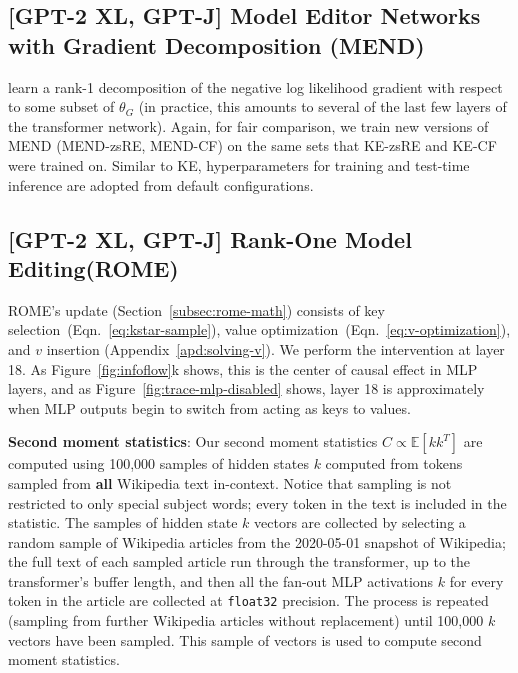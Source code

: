 \documentclass{article}
\newcommand{\methodlong}{Rank-One Model Editing\xspace}
\newcommand{\method}{ROME\xspace}
\newcommand{\reffig}[1]{Figure~\ref{fig:#1}}
\newcommand{\refeqn}[1]{Eqn.~\ref{eq:#1}}
\begin{document}
\begin{appendices}
\subsection{[GPT-2 XL, GPT-J] Model Editor Networks with Gradient Decomposition (MEND)}
\citet{mend} learn a rank-1 decomposition of the negative log likelihood gradient with respect to some subset of $\theta_G$ (in practice, this amounts to several of the last few layers of the transformer network). Again, for fair comparison, we train new versions of MEND (MEND-zsRE, MEND-CF) on the same sets that KE-zsRE and KE-CF were trained on. Similar to KE, hyperparameters for training and test-time inference are adopted from default configurations.

\subsection{[GPT-2 XL, GPT-J] \methodlong (\method)} \label{subapd:rome-hparams}

\method's update (Section~\ref{subsec:rome-math}) consists of key selection~(\refeqn{kstar-sample}), value optimization~(Eqn.~\ref{eq:v-optimization}), and $v$ insertion (Appendix~\ref{apd:solving-v}). We perform the intervention at layer 18. As \reffig{infoflow}k shows, this is the center of causal effect in MLP layers, and as \reffig{trace-mlp-disabled} shows, layer 18 is approximately when MLP outputs begin to switch from acting as keys to values.

\textbf{Second moment statistics}: Our second moment statistics $C \propto \mathbb{E}[kk^T]$ are computed using 100,000 samples of hidden states $k$ computed from tokens sampled from \textbf{all} Wikipedia text in-context.  Notice that sampling is not restricted to only special subject words; every token in the text is included in the statistic. The samples of hidden state $k$ vectors are collected by selecting a random sample of Wikipedia articles from the 2020-05-01 snapshot of Wikipedia; the full text of each sampled article run through the transformer, up to the transformer's buffer length, and then all the fan-out MLP activations $k$ for every token in the article are collected at \texttt{float32} precision.  The process is repeated (sampling from further Wikipedia articles without replacement) until 100{,}000 $k$ vectors have been sampled.  This sample of vectors is used to compute second moment statistics.


\end{appendices}
\end{document}
